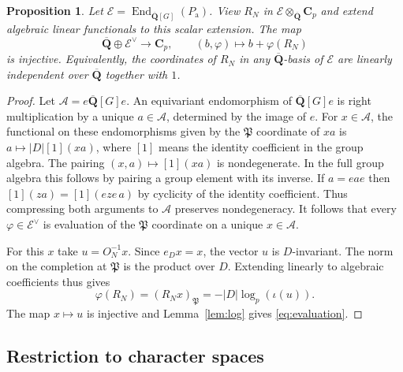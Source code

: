 \documentclass[11pt]{amsart}
\numberwithin{equation}{section}
\newtheorem{proposition}[theorem]{Proposition}
\theoremstyle{definition}
\theoremstyle{remark}
\newcommand{\Qbar}{\overline{\mathbf Q}}
\newcommand{\Cp}{\mathbf C_p}
\newcommand{\End}{\operatorname{End}}
\begin{document}
\begin{proposition}\label{prop:independent-end}
Let $\mathcal E=\End_{\Qbar[G]}(P_{\mathrm a})$.
View $R_N$ in $\mathcal E\otimes_{\Qbar}\Cp$ and extend algebraic
linear functionals to this scalar extension. The map
\begin{equation}\label{eq:evaluation}
 \Qbar\oplus\mathcal E^\vee\longrightarrow\Cp,\qquad
 (b,\varphi)\longmapsto b+\varphi(R_N)
\end{equation}
is injective. Equivalently, the coordinates of $R_N$ in
any $\Qbar$-basis of $\mathcal E$ are linearly independent
over $\Qbar$ together with $1$.
\end{proposition}

\begin{proof}
Let $\mathcal A=e\Qbar[G]e$. An equivariant endomorphism
of $\Qbar[G]e$ is right multiplication by a unique
$a\in\mathcal A$, determined by the image of $e$.
For $x\in\mathcal A$, the functional on these
endomorphisms given by the $\mathfrak P$ coordinate of
$xa$ is $a\mapsto |D|[1](xa)$, where $[1]$ means
the identity coefficient in the group algebra.
The pairing $(x,a)\mapsto[1](xa)$ is nondegenerate.
In the full group algebra this follows by pairing a
group element with its inverse. If $a=eae$ then
$[1](za)=[1](eze\,a)$ by cyclicity of the identity
coefficient. Thus compressing both arguments to
$\mathcal A$ preserves nondegeneracy. It follows that
every $\varphi\in\mathcal E^\vee$ is evaluation of the
$\mathfrak P$ coordinate on a unique $x\in\mathcal A$.

For this $x$ take $u=O_N^{-1}x$. Since $e_D x=x$,
the vector $u$ is $D$-invariant. The norm on the
completion at $\mathfrak P$ is the product over $D$.
Extending linearly to algebraic coefficients thus gives
\[
 \varphi(R_N)=(R_Nx)_{\mathfrak P}
  =-|D|\log_p(\iota(u)).
\]
The map $x\mapsto u$ is injective and
Lemma~\ref{lem:log} gives \eqref{eq:evaluation}.
\end{proof}

\subsection{Restriction to character spaces}
\end{document}

